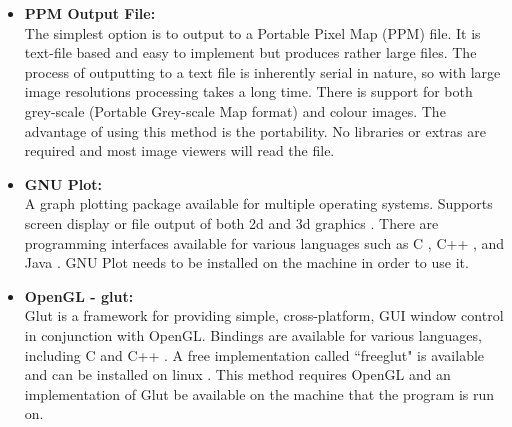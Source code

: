 \begin{itemize}
\item \textbf{PPM Output File:} \\
              The simplest option is to output to a Portable Pixel Map (PPM) file. It is 
              text-file based and easy to implement but produces rather large files. 
              The process of outputting to a text file is inherently serial in nature,
              so with large image resolutions processing takes a long time.
              There is support for both grey-scale (Portable Grey-scale Map format) and colour images. 
              The advantage of using this method is the portability. No libraries or extras are required
              and most image viewers will read the file. \cite{ppmspec}
              
\item \textbf{GNU Plot:} \\
              A graph plotting package available for multiple operating systems. 
              Supports screen display or file output of both 2d and 3d graphics \cite{gnuplot}.
              There are programming interfaces available for various languages such as C \cite{gnuplotcint}, C++ \cite{gnuplotcppint}, 
              and Java \cite{gnuplotjint}.
              GNU Plot needs to be installed on the machine in order to use it.
              
\item \textbf{OpenGL - glut:} \\
              Glut is a framework for providing simple, cross-platform, GUI window control in conjunction
              with OpenGL. Bindings are available for various languages, including C and C++ \cite{openglglut}.
              A free implementation called ``freeglut" is available and can be installed on linux \cite{freeglut}.
              This method requires OpenGL and an implementation of Glut be available on the machine that the program 
              is run on.
              
\end{itemize}


